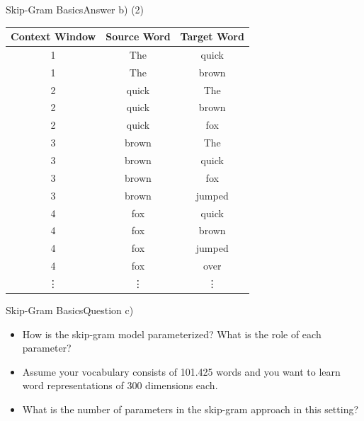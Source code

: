 \documentclass[t]{beamer}
\begin{document}
\begin{frame}{Skip-Gram Basics}{Answer b) (2)}
    \centering
    \begin{tabular}{ccc}
        \toprule
        Context Window & Source Word & Target Word \\
        \midrule
        1              & The         & quick       \\
        1              & The         & brown       \\
        2              & quick       & The         \\
        2              & quick       & brown       \\
        2              & quick       & fox         \\
        3              & brown       & The         \\
        3              & brown       & quick       \\
        3              & brown       & fox         \\
        3              & brown       & jumped      \\
        4              & fox         & quick       \\
        4              & fox         & brown       \\
        4              & fox         & jumped      \\
        4              & fox         & over        \\
        \vdots         & \vdots      & \vdots      \\
        \bottomrule
    \end{tabular}
\end{frame}

\begin{frame}{Skip-Gram Basics}{Question c)}
    \begin{itemize}
        \item How is the skip-gram model parameterized? What is the role of each
              parameter?
        \item Assume your vocabulary consists of 101.425 words and you want to
              learn word representations of 300 dimensions each.
        \item What is the number of parameters in the skip-gram approach in this
              setting?
    \end{itemize}
\end{frame}
\end{document}
